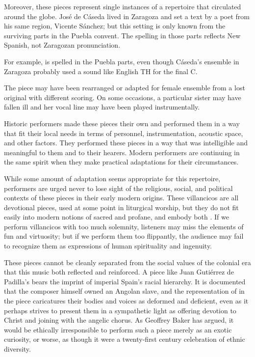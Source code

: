 Moreover, these pieces represent single instances of a repertoire that
circulated around the globe. 
José de Cáseda lived in Zaragoza and set a text by a poet from his same
region, Vicente Sánchez; but this setting is only known from the surviving parts
in the Puebla convent.
The spelling in those parts reflects New Spanish, not Zaragozan pronunciation.%
\begin{Footnote}
    For example,  is spelled  in
    the Puebla parts, even though Cáseda's ensemble in Zaragoza probably used a
    sound like English TH for the final C.
\end{Footnote}
The piece may have been rearranged or adapted for female ensemble from a lost
original with different scoring.
On some occasions, a particular sister may have fallen ill and her vocal line
may have been played instrumentally.

Historic performers made these pieces their own and performed them in a way
that fit their local needs in terms of personnel, instrumentation, acoustic
space, and other factors.
They performed these pieces in a way that was intelligible and meaningful to
them and to their hearers.
Modern performers are continuing in the same spirit when they make practical
adaptations for their circumstances.

While some amount of adaptation seems appropriate for this repertoire,
performers are urged never to lose sight of the religious, social, and political
contexts of these pieces in their early modern origins.
These villancicos are all devotional pieces, used at some point in liturgical
worship, but they do not fit easily into modern notions of sacred and profane,
and embody both .%
    \Autocite{Cashner:Cards}
If we perform villancicos with too much solemnity, listeners may miss the
elements of fun and virtuosity;
but if we perform them too flippantly, the audience may fail to recognize them
as expressions of human spirituality and ingenuity.

These pieces cannot be cleanly separated from the social values of the colonial
era that this music both reflected and reinforced.
A piece like Juan Gutiérrez de Padilla's 
bears the imprint of imperial Spain's racial hierarchy. 
It is documented that the composer himself owned an Angolan slave,%
    \Autocite{Mauleon:PadillaCivil}
and the representation of  in the piece caricatures their
bodies and voices as deformed and deficient, even as it perhaps strives to
present them in a sympathetic light as offering devotion to Christ and joining
with the angelic chorus.
As Geoffrey Baker has argued, it would be ethically irresponsible to perform
such a piece merely as an exotic curiosity, or worse, as though it were a
twenty-first century celebration of ethnic diversity.%
    \Autocite{Baker:PerformancePostColonial}

